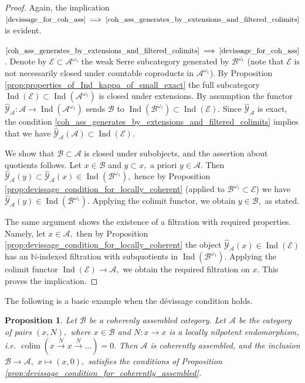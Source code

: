 \documentclass[11pt,leqno]{amsart}
\newcommand{\Implies}[2]{$\text{\ref{#1}}\implies\text{\ref{#2}}$}
\newtheorem{prop}[theo]{Proposition}
\numberwithin{equation}{section}
\def\N{\mathbb{N}}
\DeclareMathOperator*{\colim}{colim}
\newcommand{\xto}{\xrightarrow}
\newcommand{\cA}{{\mathcal A}}
\newcommand{\cB}{{\mathcal B}}
\newcommand{\cE}{{\mathcal E}}
\newcommand{\cY}{{\mathcal Y}}
\newcommand{\Ind}{\operatorname{Ind}}
\begin{document}
\begin{proof}
Again, the implication \Implies{devissage_for_coh_ass}{coh_ass_generates_by_extensions_and_filtered_colimits} is evident.

\Implies{coh_ass_generates_by_extensions_and_filtered_colimits}{devissage_for_coh_ass}. Denote by $\cE\subset\cA^{\omega_1}$ the weak Serre subcategory generated by $\cB^{\omega_1}$ (note that $\cE$ is not necessarily closed under countable coproducts in $\cA^{\omega_1}$). By Proposition \ref{prop:properties_of_Ind_kappa_of_small_exact} the full subcategory $\Ind(\cE)\subset\Ind(\cA^{\omega_1})$ is closed under extensions. By assumption the functor $\hat{\cY}_{\cA}:\cA\to\Ind(\cA^{\omega_1})$ sends $\cB$ to $\Ind(\cB^{\omega_1})\subset\Ind(\cE).$ Since $\hat{\cY}_{\cA}$ is exact, the condition \ref{coh_ass_generates_by_extensions_and_filtered_colimits} implies that we have $\hat{\cY}_{\cA}(\cA)\subset\Ind(\cE).$

We show that $\cB\subset\cA$ is closed under subobjects, and the assertion about quotients follows. Let $x\in\cB$ and $y\subset x,$ a priori $y\in\cA.$ Then $\hat{\cY}_{\cA}(y)\subset \hat{\cY}_{\cA}(x)\in\Ind(\cB^{\omega_1}),$ hence by Proposition \ref{prop:devissage_condition_for_locally_coherent} (applied to $\cB^{\omega_1}\subset\cE$) we have $\hat{\cY}_{\cA}(y)\in\Ind(\cB^{\omega_1}).$ Applying the colimit functor, we obtain $y\in\cB,$ as stated.

The same argument shows the existence of a filtration with required properties. Namely, let $x\in\cA,$ then by Proposition \ref{prop:devissage_condition_for_locally_coherent} the object $\hat{\cY}_{\cA}(x)\in\Ind(\cE)$ has an $\N$-indexed filtration with subquotients in $\Ind(\cB^{\omega_1}).$ Applying the colimit functor $\Ind(\cE)\to\cA,$ we obtain the required filtration on $x.$ This proves the implication.
\end{proof}

The following is a basic example when the d\'evissage condition holds.

\begin{prop}\label{prop:loc_nilp_endomorphisms_coherently_assembled}
Let $\cB$ be a coherenly assembled category. Let $\cA$ be the category of pairs $(x,N),$ where $x\in\cB$ and $N:x\to x$ is a locally nilpotent endomorphism, i.e. $\colim(x\xto{N}x\xto{N}\dots)=0.$ Then $\cA$ is coherently assembled, and the inclusion $\cB\to\cA,$ $x\mapsto (x,0),$ satisfies the conditions of Proposition \ref{prop:devissage_condition_for_coherently_assembled}.
\end{prop}
\end{document}
